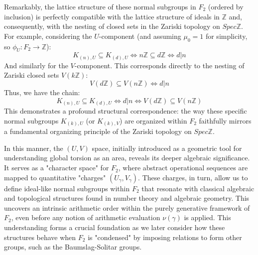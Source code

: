 Remarkably, the lattice structure of these normal subgroups in $F_2$ (ordered by inclusion) is perfectly compatible with the lattice structure of ideals in $\mathbb{Z}$ and, consequently, with the nesting of closed sets in the Zariski topology on $Spec \mathbb{Z}$. For example, considering the $U$-component (and assuming $\mu_0=1$ for simplicity, so $\phi_U: F_2 \to \mathbb{Z}$):
\[ K_{(n),U} \subseteq K_{(d),U} \iff n\mathbb{Z} \subseteq d\mathbb{Z} \iff d|n \]
And similarly for the $V$-component. This corresponds directly to the nesting of Zariski closed sets $V(k\mathbb{Z})$:
\[ V(d\mathbb{Z}) \subseteq V(n\mathbb{Z}) \iff d|n \]
Thus, we have the chain:
\[ K_{(n),U} \subseteq K_{(d),U} \iff d|n \iff V(d\mathbb{Z}) \subseteq V(n\mathbb{Z}) \]
This demonstrates a profound structural correspondence: the way these specific normal subgroups $K_{(k),U}$ (or $K_{(k),V}$) are organized within $F_2$ faithfully mirrors a fundamental organizing principle of the Zariski topology on $Spec \mathbb{Z}$.

In this manner, the $(U,V)$ space, initially introduced as a geometric tool for understanding global torsion as an area, reveals its deeper algebraic significance. It serves as a "character space" for $F_2$, where abstract operational sequences are mapped to quantitative "charges" $(U_\gamma, V_\gamma)$. These charges, in turn, allow us to define ideal-like normal subgroups within $F_2$ that resonate with classical algebraic and topological structures found in number theory and algebraic geometry. This uncovers an intrinsic arithmetic order within the purely generative framework of $F_2$, even before any notion of arithmetic evaluation $\nu(\gamma)$ is applied. This understanding forms a crucial foundation as we later consider how these structures behave when $F_2$ is "condensed" by imposing relations to form other groups, such as the Baumslag-Solitar groups.

